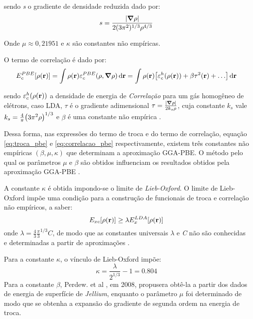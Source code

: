 sendo \textit{s} o gradiente de densidade reduzida dado por:
\begin{equation}
	s=\frac{\abs{\grad{\rho}}}{2(3\pi^2)^{1/3}\rho^{4/3}}
\end{equation}

Onde $ \mu\approx0,21951 $ e $ \kappa$ são constantes não empíricas.

O termo de correlação é dado por:
\begin{equation}\label{eq:correlacao_pbe}
	E_{c}^{PBE}\bqty{\dens}=\int \dens \varepsilon_{c}^{PBE}(\rho,\grad{\rho})\dr=\int \dens \bqty{\varepsilon_{c}^{h}(\dens)+\beta\tau^2(\vb{r})+\ldots}\dr
\end{equation}

sendo $  \varepsilon_{c}^{h}(\rho(\vb{r})) $ a densidade de energia de \textit{Correlação} para um gás homogêneo de elétrons, caso LDA, $ \tau $ é o gradiente adimensional $\tau=\frac{\abs{\grad{\rho}}}{2k_s\rho}$, cuja constante $ k_s $ vale $k_s=\frac{4}{\pi}\pqty{3\pi^2\rho}^{1/3} $ e $\beta$ é uma constante não empírica \cite{rev_dft}.

Dessa forma, nas expressões do termo de troca e do termo de correlação, equação \eqref{eq:troca_pbe} e \eqref{eq:correlacao_pbe} respectivamente, existem três constantes não empíricas $ (\beta, \mu, \kappa) $ que determinam a aproximação GGA-PBE. O método pelo qual os parâmetros $ \mu $ e $ \beta $ são obtidos influenciam os resultados obtidos pela aproximação GGA-PBE \cite{tese_luana}.


A constante $ \kappa $ é obtida impondo-se o limite de \textit{Lieb-Oxford}. O limite de Lieb-Oxford impõe uma condição para a construção de funcionais de troca e correlação não empíricos, a saber:
\begin{equation}
	E_{xc}\bqty{\dens}\geq\lambda E_{x}^{LDA}\bqty{\dens}
\end{equation}
onde $ \lambda=\frac{4}{3}\frac{\pi}{3}^{1/3} C $, de modo que as constantes universais $ \lambda$ e \textit{C} não são conhecidas e determinadas a partir de aproximações \cite{l_oxford}.

Para a constante $ \kappa $, o vínculo de Lieb-Oxford impõe:
\begin{equation}
	\kappa=\frac{\lambda}{2^{1/3}}-1=0.804	
\end{equation}
Para a constante $ \beta $, Perdew. et al \cite{perdew_pbe_beta}, em 2008, propusera obtê-la a partir dos dados de energia de superfície de \textit{Jellium}, enquanto o parâmetro $ \mu $ foi determinado de modo que se obtenha a expansão do gradiente de segunda ordem na energia de troca.

